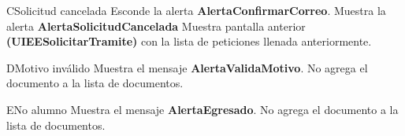 \begin{UCtrayectoriaA}{C}{Solicitud cancelada} 
 \UCpaso Esconde la alerta  {\bf AlertaConfirmarCorreo}.
 \UCpaso Muestra la alerta {\bf AlertaSolicitudCancelada }
 \UCpaso Muestra pantalla anterior {\bf (UIEESolicitarTramite)} con la lista de peticiones llenada anteriormente.
\end{UCtrayectoriaA}

\begin{UCtrayectoriaA}{D}{Motivo inválido} 
\UCpaso Muestra el mensaje {\bf AlertaValidaMotivo}.
  \UCpaso No agrega el documento a la lista de documentos.
\end{UCtrayectoriaA}


\begin{UCtrayectoriaA}{E}{No alumno} 
\UCpaso Muestra el mensaje {\bf AlertaEgresado}.
  \UCpaso No agrega el documento a la lista de documentos.
\end{UCtrayectoriaA}
